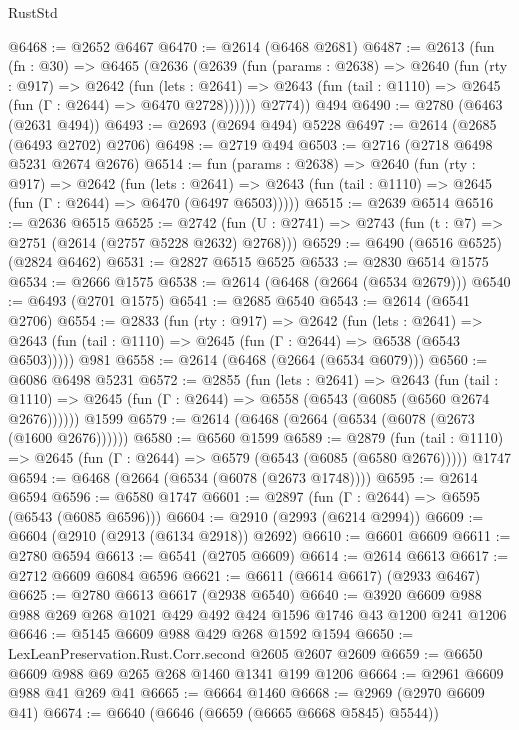 \begin{lexlean}{RustStd}
\begin{coremodule}
@6468 := @2652 @6467
@6470 := @2614 (@6468 @2681)
@6487 := @2613
    (fun (fn : @30) =>
    @6465
      (@2636
        (@2639
          (fun (params : @2638) =>
          @2640
            (fun (rty : @917) =>
            @2642
              (fun (lets : @2641) =>
              @2643 (fun (tail : @1110) => @2645 (fun (Γ : @2644) => @6470 @2728))))))
        @2774))
    @494
@6490 := @2780 (@6463 (@2631 @494))
@6493 := @2693 (@2694 @494) @5228
@6497 := @2614 (@2685 (@6493 @2702) @2706)
@6498 := @2719 @494
@6503 := @2716 (@2718 @6498 @5231 @2674 @2676)
@6514 := fun (params : @2638) =>
  @2640
    (fun (rty : @917) =>
    @2642
      (fun (lets : @2641) =>
      @2643 (fun (tail : @1110) => @2645 (fun (Γ : @2644) => @6470 (@6497 @6503)))))
@6515 := @2639 @6514
@6516 := @2636 @6515
@6525 := @2742 (fun (U : @2741) => @2743 (fun (t : @7) => @2751 (@2614 (@2757 @5228 @2632) @2768)))
@6529 := @6490 (@6516 @6525) (@2824 @6462)
@6531 := @2827 @6515 @6525
@6533 := @2830 @6514 @1575
@6534 := @2666 @1575
@6538 := @2614 (@6468 (@2664 (@6534 @2679)))
@6540 := @6493 (@2701 @1575)
@6541 := @2685 @6540
@6543 := @2614 (@6541 @2706)
@6554 := @2833
    (fun (rty : @917) =>
    @2642
      (fun (lets : @2641) =>
      @2643 (fun (tail : @1110) => @2645 (fun (Γ : @2644) => @6538 (@6543 @6503)))))
    @981
@6558 := @2614 (@6468 (@2664 (@6534 @6079)))
@6560 := @6086 @6498 @5231
@6572 := @2855
    (fun (lets : @2641) =>
    @2643
      (fun (tail : @1110) => @2645 (fun (Γ : @2644) => @6558 (@6543 (@6085 (@6560 @2674 @2676))))))
    @1599
@6579 := @2614 (@6468 (@2664 (@6534 (@6078 (@2673 (@1600 @2676))))))
@6580 := @6560 @1599
@6589 := @2879
    (fun (tail : @1110) => @2645 (fun (Γ : @2644) => @6579 (@6543 (@6085 (@6580 @2676)))))
    @1747
@6594 := @6468 (@2664 (@6534 (@6078 (@2673 @1748))))
@6595 := @2614 @6594
@6596 := @6580 @1747
@6601 := @2897 (fun (Γ : @2644) => @6595 (@6543 (@6085 @6596)))
@6604 := @2910 (@2993 (@6214 @2994))
@6609 := @6604 (@2910 (@2913 (@6134 @2918)) @2692)
@6610 := @6601 @6609
@6611 := @2780 @6594
@6613 := @6541 (@2705 @6609)
@6614 := @2614 @6613
@6617 := @2712 @6609 @6084 @6596
@6621 := @6611 (@6614 @6617) (@2933 @6467)
@6625 := @2780 @6613 @6617 (@2938 @6540)
@6640 := @3920 @6609 @988 @988 @269 @268 @1021 @429 @492 @424 @1596 @1746 @43 @1200 @241 @1206
@6646 := @5145 @6609 @988 @429 @268 @1592 @1594
@6650 := LexLeanPreservation.Rust.Corr.second @2605 @2607 @2609
@6659 := @6650 @6609 @988 @69 @265 @268 @1460 @1341 @199 @1206
@6664 := @2961 @6609 @988 @41 @269 @41
@6665 := @6664 @1460
@6668 := @2969 (@2970 @6609 @41)
@6674 := @6640 (@6646 (@6659 (@6665 @6668 @5845) @5544))

\end{coremodule}
\end{lexlean}
